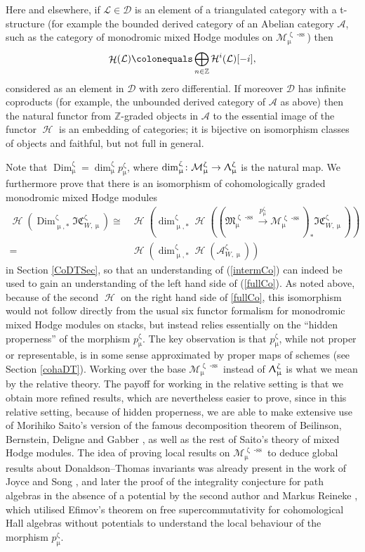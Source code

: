 \documentclass[a4paper,10pt]{amsart}
\renewcommand{\zeta}{\upzeta}
\renewcommand{\Lambda}{\Uplambda}
\renewcommand{\mu}{\upmu}
\newcommand{\Mst}{\mathfrak{M}}
\newcommand{\Msp}{\mathcal{M}}
\newcommand{\ICSt}{\mathfrak{IC}}
\DeclareMathOperator{\sst}{-ss}
\DeclareMathOperator{\Dim}{\mathrm{Dim}}
\DeclareMathOperator{\Ho}{\mathcal{H}}
\begin{document}
Here and elsewhere, if $\mathcal{L}\in\mathcal{D}$ is an element of a triangulated category with a t-structure (for example the bounded derived category of an Abelian category $\mathcal{A}$, such as the category of monodromic mixed Hodge modules on $\Msp_{\mu}^{\zeta\sst}$) then 
\[
\Ho(\mathcal{L})\colonequals \bigoplus_{n\in\mathbb{Z}}\mathcal{H}^i(\mathcal{L})[-i],
\]
considered as an element in $\mathcal{D}$ with zero differential.  If moreover $\mathcal{D}$ has infinite coproducts (for example, the unbounded derived category of $\mathcal{A}$ as above) then the natural functor from $\mathbb{Z}$-graded objects in $\mathcal{A}$ to the essential image of the functor $\Ho$ is an embedding of categories; it is bijective on isomorphism classes of objects and faithful, but not full in general.

Note that $\Dim^{\zeta}_{\mu}=\dim^{\zeta}_{\mu}p^{\zeta}_{\mu}$, where $\dim^{\zeta}_{\mu}\colon\Msp_{\mu}^{\zeta}\rightarrow\Lambda_{\mu}^{\zeta}$ is the natural map.  We furthermore prove that there is an isomorphism of cohomologically graded monodromic mixed Hodge modules
\begin{align}
\label{fullCo}
\Ho\left(\Dim^{\zeta}_{\mu,*}\ICSt_{W,\mu}^{\zeta}\right)\cong &\Ho\left(\dim_{\mu,*}^{\zeta}\Ho\left((\Mst^{\zeta\sst}_{\mu}\xrightarrow{p^{\zeta}_{\mu}}\Msp^{\zeta\sst}_{\mu})_*\ICSt_{W,\mu}^{\zeta}\right)\right)\\
=&\Ho\left(\dim_{\mu,*}^{\zeta}\Ho\left(\mathcal{A}_{W,\mu}^{\zeta}\right)\right)\nonumber
\end{align}
in Section \ref{CoDTSec}, so that an understanding of (\ref{intermCo}) can indeed be used to gain an understanding of the left hand side of (\ref{fullCo}).  As noted above, because of the second $\Ho$ on the right hand side of \eqref{fullCo}, this isomorphism would not follow directly from the usual six functor formalism for monodromic mixed Hodge modules on stacks, but instead relies essentially on the ``hidden properness'' of the morphism $p^{\zeta}_{\mu}$.    The key observation is that $p^{\zeta}_{\mu}$, while not proper or representable, is in some sense approximated by proper maps of schemes (see Section \ref{cohaDT}).  
\smallbreak
Working over the base $\Msp^{\zeta\sst}_{\mu}$ instead of $\Lambda_{\mu}^{\zeta}$ is what we mean by the relative theory.  The payoff for working in the relative setting is that we obtain more refined results, which are nevertheless easier to prove, since in this relative setting, because of hidden properness, we are able to make extensive use of Morihiko Saito's version \cite{Sai88,Saito1,Saito89} of the famous decomposition theorem of Beilinson, Bernstein, Deligne and Gabber \cite{BBD}, as well as the rest of Saito's theory of mixed Hodge modules.
\smallbreak
The idea of proving local results on $\Msp_{\mu}^{\zeta\sst}$ to deduce global results about Donaldson--Thomas invariants was already present in the work of Joyce and Song \cite{JoyceDT}, and later the proof of the integrality conjecture for path algebras in the absence of a potential by the second author and Markus Reineke \cite{Meinhardt14}, which utilised Efimov's theorem \cite{Efimov} on free supercommutativity for cohomological Hall algebras without potentials to understand the local behaviour of the morphism $p^{\zeta}_{\mu}$. 
\end{document}

